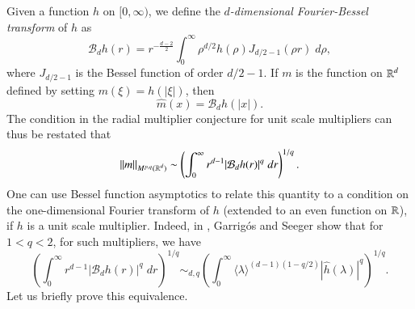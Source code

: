 Given a function $h$ on $[0,\infty)$, we define the \emph{$d$-dimensional Fourier-Bessel transform} of $h$ as
%
 \[ \mathcal{B}_d h(r) = r^{- \frac{d-2}{2}} \int_0^\infty \rho^{d/2} h(\rho) J_{d/2-1}(\rho r)\; d\rho, \]
%
where $J_{d/2-1}$ is the Bessel function of order $d/2 - 1$. If $m$ is the function on $\operatorname{\mathbb{R}}^d$ defined by setting $m(\xi) = h(|\xi|)$, then
%
\[ \widehat{m}(x) = \mathcal{B}_d h(|x|). \]
%
The condition in the radial multiplier conjecture for unit scale multipliers can thus be restated that
%
\[ \| m \|_{M^{p,q}(\operatorname{\mathbb{R}}^d)} \sim \left( \int_0^\infty r^{d-1} |\mathcal{B}_d h(r)|^q\; dr \right)^{1/q}. \]
%
%
%
One can use Bessel function asymptotics to relate this quantity to a condition on the one-dimensional Fourier transform of $h$ (extended to an even function on $\operatorname{\mathbb{R}}$), if $h$ is a unit scale multiplier. Indeed, in \cite{GarrigosandSeeger}, Garrig\'{o}s and Seeger show that for $1 < q < 2$, for such multipliers, we have
%
\[ \left( \int_0^\infty r^{d-1} |\mathcal{B}_d h(r)|^q\; dr \right)^{1/q} \sim_{d,q} \left( \int_0^\infty \langle \lambda \rangle^{(d-1)(1 - q/2)} |\widehat{h}(\lambda)|^q \right)^{1/q}. \]
%
Let us briefly prove this equivalence.

